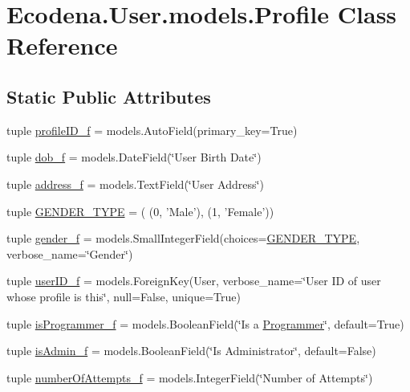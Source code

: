 \hypertarget{class_ecodena_1_1_user_1_1models_1_1_profile}{
\section{Ecodena.User.models.Profile Class Reference}
\label{d2/de8/class_ecodena_1_1_user_1_1models_1_1_profile}
}
\subsection*{Static Public Attributes}
\begin{DoxyCompactItemize}
\item 
tuple \hyperlink{class_ecodena_1_1_user_1_1models_1_1_profile_ae4b22732124303ac690d9d6347f8888b}{profileID\_\-f} = models.AutoField(primary\_\-key=True)
\item 
tuple \hyperlink{class_ecodena_1_1_user_1_1models_1_1_profile_aa21eaecc5ddfe2d63af834e8872bbae5}{dob\_\-f} = models.DateField(\char`\"{}User Birth Date\char`\"{})
\item 
tuple \hyperlink{class_ecodena_1_1_user_1_1models_1_1_profile_ad435c6b65d26e301bf02a029a83b6a5a}{address\_\-f} = models.TextField(\char`\"{}User Address\char`\"{})
\item 
tuple \hyperlink{class_ecodena_1_1_user_1_1models_1_1_profile_ab5f64a30a5708c602dd1eef94ccd811d}{GENDER\_\-TYPE} = ( (0, 'Male'), (1, 'Female'))
\item 
tuple \hyperlink{class_ecodena_1_1_user_1_1models_1_1_profile_ab5e59193a1b014e2f6ce017850bbc429}{gender\_\-f} = models.SmallIntegerField(choices=\hyperlink{class_ecodena_1_1_user_1_1models_1_1_profile_ab5f64a30a5708c602dd1eef94ccd811d}{GENDER\_\-TYPE}, verbose\_\-name=\char`\"{}Gender\char`\"{})
\item 
tuple \hyperlink{class_ecodena_1_1_user_1_1models_1_1_profile_a2459a7c3980469d894a491c4aa5e72e1}{userID\_\-f} = models.ForeignKey(User, verbose\_\-name=\char`\"{}User ID of user whose profile is this\char`\"{}, null=False, unique=True)
\item 
tuple \hyperlink{class_ecodena_1_1_user_1_1models_1_1_profile_ab696510431c027177451da1e4a6bdc0b}{isProgrammer\_\-f} = models.BooleanField(\char`\"{}Is a \hyperlink{class_ecodena_1_1_user_1_1models_1_1_programmer}{Programmer}\char`\"{}, default=True)
\item 
tuple \hyperlink{class_ecodena_1_1_user_1_1models_1_1_profile_ada687883f8de1aa44a0feee2448b61b8}{isAdmin\_\-f} = models.BooleanField(\char`\"{}Is Administrator\char`\"{}, default=False)
\item 
tuple \hyperlink{class_ecodena_1_1_user_1_1models_1_1_profile_a7cfe404d70a33ce89be1a5d51c9cafba}{numberOfAttempts\_\-f} = models.IntegerField(\char`\"{}Number of Attempts\char`\"{})
\end{DoxyCompactItemize}


